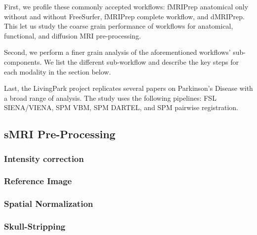 \documentclass[conference]{IEEEtran}
\begin{document}
First, we profile these commonly accepted workflows: fMRIPrep anatomical only without and without FreeSurfer, fMRIPrep complete workflow, and dMRIPrep. This let us study the coarse grain performance of workflows for anatomical, functional, and diffusion MRI pre-processing.

Second, we perform a finer grain analysis of the aforementioned workflows' sub-components. We list the different sub-workflow and describe the key steps for each modality in the section below.

Last, the LivingPark project replicates several papers on Parkinson's Disease with a broad range of analysis. The study uses the following pipelines: FSL SIENA/VIENA, SPM VBM, SPM DARTEL, and SPM pairwise registration.

\subsection{sMRI Pre-Processing}
\subsubsection{Intensity correction}

\subsubsection{Reference Image}

\subsubsection{Spatial Normalization}


\subsubsection{Skull-Stripping}
\end{document}

